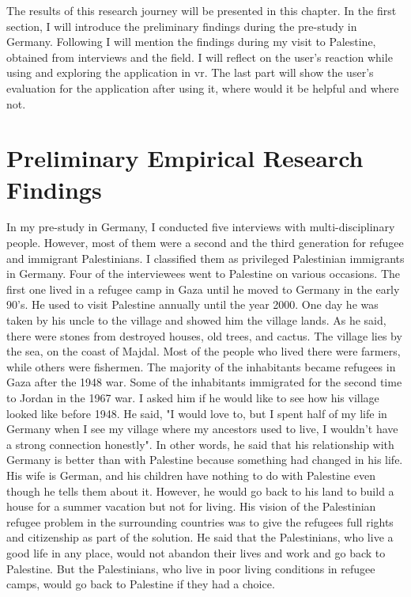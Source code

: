 The results of this research journey will be presented in this chapter. In the first section, I will introduce the preliminary findings during the pre-study in Germany. Following I will mention the findings during my visit to Palestine, obtained from interviews and the field. I will reflect on the user's reaction while using and exploring the application in \acrlong{vr}. The last part will show the user's evaluation for the application after using it, where would it be helpful and where not.


\section{Preliminary Empirical Research Findings}

In my pre-study in Germany, I conducted five interviews with multi-disciplinary people. However, most of them were a second and the third generation for refugee and immigrant Palestinians. I classified them as privileged Palestinian immigrants in Germany. Four of the interviewees went to Palestine on various occasions. The first one lived in a refugee camp in Gaza until he moved to Germany in the early 90's.  He used to visit Palestine annually until the year 2000. One day he was taken by his uncle to the village and showed him the village lands. As he said, there were stones from destroyed houses, old trees, and cactus. The village lies by the sea, on the coast of Majdal. Most of the people who lived there were farmers, while others were fishermen. The majority of the inhabitants became refugees in Gaza after the 1948 war. Some of the inhabitants immigrated for the second time to Jordan in the 1967 war. I asked him if he would like to see how his village looked like before 1948. He said, "I would love to, but I spent half of my life in Germany when I see my village where my ancestors used to live, I wouldn't have a strong connection honestly". In other words, he said that his relationship with Germany is better than with Palestine because something had changed in his life. His wife is German, and his children have nothing to do with Palestine even though he tells them about it. However, he would go back to his land to build a house for a summer vacation but not for living. His vision of the Palestinian refugee problem in the surrounding countries was to give the refugees full rights and citizenship as part of the solution. He said that the Palestinians, who live a good life in any place, would not abandon their lives and work and go back to Palestine. But the Palestinians, who live in poor living conditions in refugee camps, would go back to Palestine if they had a choice.
  


